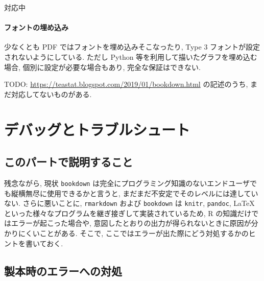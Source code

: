 \documentclass[
]{bxjsbook}
\theoremstyle{definition}
\theoremstyle{definition}
\theoremstyle{definition}
\theoremstyle{remark}
\begin{document}
対応中

\hypertarget{ux30d5ux30a9ux30f3ux30c8ux306eux57cbux3081ux8fbcux307f}{%
\subsection{フォントの埋め込み}\label{ux30d5ux30a9ux30f3ux30c8ux306eux57cbux3081ux8fbcux307f}}

少なくとも PDF ではフォントを埋め込みそこなったり, Type 3
フォントが設定されないようにしている. ただし Python
等を利用して描いたグラフを埋め込む場合, 個別に設定が必要な場合もあり,
完全な保証はできない.

TODO: \url{https://teastat.blogspot.com/2019/01/bookdown.html}
の記述のうち, まだ対応してないものがある.

\hypertarget{part-ux30c7ux30d0ux30c3ux30b0ux3068ux30c8ux30e9ux30d6ux30ebux30b7ux30e5ux30fcux30c8}{%
\part{
デバッグとトラブルシュート}\label{part-ux30c7ux30d0ux30c3ux30b0ux3068ux30c8ux30e9ux30d6ux30ebux30b7ux30e5ux30fcux30c8}}

\hypertarget{ux3053ux306eux30d1ux30fcux30c8ux3067ux8aacux660eux3059ux308bux3053ux3068}{%
\chapter*{このパートで説明すること}\label{ux3053ux306eux30d1ux30fcux30c8ux3067ux8aacux660eux3059ux308bux3053ux3068}}

残念ながら, 現状 \texttt{bookdown}
は完全にプログラミング知識のないエンドユーザでも縦横無尽に使用できるかと言うと,
まだまだ不安定でそのレベルには達していない. さらに悪いことに,
\texttt{rmarkdown} および \texttt{bookdown} は \texttt{knitr},
\texttt{pandoc}, LaTeX
といった様々なプログラムを継ぎ接ぎして実装されているため, R
の知識だけではエラーが起こった場合や,
意図したとおりの出力が得られないときに原因が分かりにくいことがある.
そこで, ここではエラーが出た際にどう対処するかのヒントを書いておく.

\hypertarget{ux88fdux672cux6642ux306eux30a8ux30e9ux30fcux3078ux306eux5bfeux51e6}{%
\chapter{製本時のエラーへの対処}\label{ux88fdux672cux6642ux306eux30a8ux30e9ux30fcux3078ux306eux5bfeux51e6}}
\end{document}
